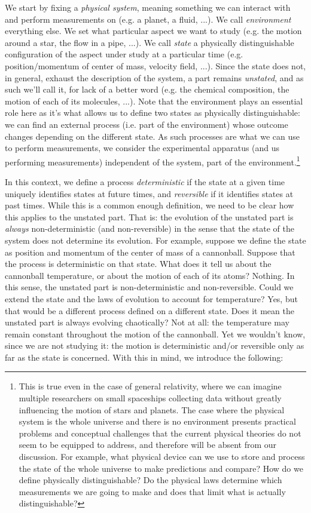 \documentclass[aps,pra,10pt,twocolumn,floatfix,nofootinbib]{revtex4-1}
\theoremstyle{definition}
\begin{document}
We start by fixing a \emph{physical system}, meaning something we can interact with and perform measurements on (e.g. a planet, a fluid, ...). We call \emph{environment} everything else. We set what particular aspect we want to study (e.g. the motion around a star, the flow in a pipe, ...). We call \emph{state} a physically distinguishable configuration of the aspect under study at a particular time (e.g. position/momentum of center of mass, velocity field, ...). Since the state does not, in general, exhaust the description of the system, a part remains \emph{unstated}, and as such we'll call it, for lack of a better word (e.g. the chemical composition, the motion of each of its molecules, ...). Note that the environment plays an essential role here as it's what allows us to define two states as physically distinguishable: we can find an external process (i.e. part of the environment) whose outcome changes depending on the different state. As such processes are what we can use to perform measurements, we consider the experimental apparatus (and us performing measurements) independent of the system, part of the environment.\footnote{This is true even in the case of general relativity, where we can imagine multiple researchers on small spaceships collecting data without greatly influencing the motion of stars and planets. The case where the physical system is the whole universe and there is no environment presents practical problems  and conceptual challenges that the current physical theories do not seem to be equipped to address, and therefore will be absent from our discussion. For example, what physical device can we use to store and process the state of the whole universe to make predictions and compare? How do we define physically distinguishable? Do the physical laws determine which measurements we are going to make and does that limit what is actually distinguishable?}
 
In this context, we define a process \emph{deterministic} if the state at a given time uniquely identifies states at future times, and \emph{reversible} if it identifies states at past times. While this is a common enough definition, we need to be clear how this applies to the unstated part. That is: the evolution of the unstated part is \emph{always} non-deterministic (and non-reversible) in the sense that the state of the system does not determine its evolution. For example, suppose we define the state as position and momentum of the center of mass of a cannonball. Suppose that the process is deterministic on that state. What does it tell us about the cannonball temperature, or about the motion of each of its atoms? Nothing. In this sense, the unstated part is non-deterministic and non-reversible. Could we extend the state and the laws of evolution to account for temperature? Yes, but that would be a different process defined on a different state. Does it mean the unstated part is always evolving chaotically? Not at all: the temperature may remain constant throughout the motion of the cannonball. Yet we wouldn't know, since we are not studying it: the motion is deterministic and/or reversible only as far as the state is concerned. With this in mind, we introduce the following:
\end{document}
